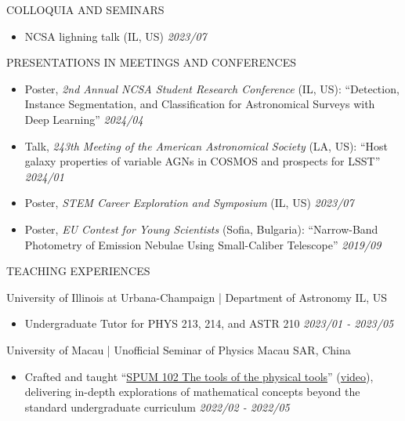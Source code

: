 \documentclass[11pt]{article} %
\begin{document}
\begin{section}{COLLOQUIA AND SEMINARS}

\begin{itemize}[leftmargin=1.5em]
    \item NCSA lighning talk (IL, US) \hfill \textit{2023/07} 
\end{itemize}

\end{section}

\begin{section}{PRESENTATIONS IN MEETINGS AND CONFERENCES}

\begin{itemize}[leftmargin=1.5em]
    \item Poster, \textit{2nd Annual NCSA Student Research Conference} (IL, US): ``Detection, Instance Segmentation, and Classification for Astronomical Surveys with Deep Learning'' \hfill \textit{2024/04} 
    \item Talk, \textit{243th Meeting of the American Astronomical Society} (LA, US): ``Host galaxy properties of variable AGNs in COSMOS and prospects for LSST'' \hfill \textit{2024/01} 
    \item Poster, \textit{STEM Career Exploration and Symposium} (IL, US) \hfill \textit{2023/07} 
    \item Poster, \textit{EU Contest for Young Scientists} (Sofia, Bulgaria): ``Narrow-Band Photometry of Emission Nebulae Using Small-Caliber Telescope'' \hfill \textit{2019/09} 
\end{itemize}

\end{section}

\begin{section}{TEACHING EXPERIENCES}

University of Illinois at Urbana-Champaign | Department of Astronomy \hfill IL, US
\begin{itemize}[leftmargin=1.5em]
    \item Undergraduate Tutor for PHYS 213, 214, and ASTR 210 \hfill \textit{2023/01 - 2023/05}
\end{itemize}

University of Macau | Unofficial Seminar of Physics \hfill Macau SAR, China
\begin{itemize}[leftmargin=1.5em]
    \item Crafted and taught ``\href{https://github.com/Chisen-Lupus/Seminar-of-Physics-UM/blob/main/SPUM%20102%20The%20tools%20of%20physical%20tool.pdf}{SPUM 102 The tools of the physical tools}'' (\href{https://www.youtube.com/watch?v=nQkv03r-XeQ&list=PLV9fHDZW7hHWQ9rrAk7c9kdeV-Lqyt7pV&index=10}{video}), delivering in-depth explorations of mathematical concepts beyond the standard undergraduate curriculum \hfill \textit{2022/02 - 2022/05}
\end{itemize}

\end{section}
\end{document}

